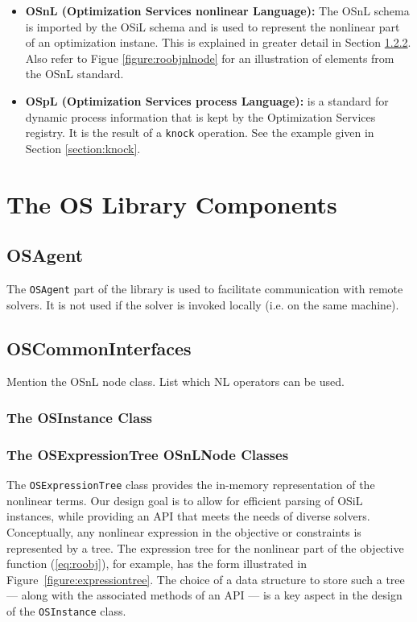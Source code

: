 \documentclass[11pt]{article}
\newcounter{Fig}
\renewcommand{\_}{{\char"5F}}
\renewcommand{\{}{{\char"7B}}
\renewcommand{\}}{{\char"7D}}
\renewcommand{\^}{{\char"0D}}
\renewcommand{\'}{{\char"0D}}
\begin{document}
\begin{itemize}
\item[] {\bf OSnL (Optimization Services nonlinear Language):}  The OSnL schema is imported by the OSiL schema and is used to represent the nonlinear part of an optimization instane. This is explained in greater detail in Section \ref{section:osexpressiontreeclass}. Also refer to Figue \ref{figure:roobjnlnode} for an illustration of elements from the OSnL standard. 



\item[]   {\bf OSpL (Optimization Services process Language):} is a standard for dynamic process information that is kept by the Optimization Services registry. 
It is the result of a {\tt knock} operation. See the example given in Section \ref{section:knock}.

\end{itemize}

\section{The OS Library Components}\label{section:oslibrary}

\subsection{OSAgent}\label{section:osagent}

The {\tt OSAgent}  part of the library is used to facilitate communication with remote solvers. It is not used if the solver is invoked locally (i.e. on the same machine). 

\subsection{OSCommonInterfaces}

Mention the OSnL node class. List which NL operators can be used.

\subsubsection{The OSInstance Class}\label{section:osinstanceclass}

\subsubsection{The OSExpressionTree OSnLNode Classes}\label{section:osexpressiontreeclass}

The {\tt OSExpressionTree} class provides the in-memory representation of the nonlinear terms.  Our design goal is  to allow for efficient parsing of OSiL instances, while providing an API that meets the needs of diverse solvers.  Conceptually, any nonlinear expression in the objective or constraints is represented by a tree.  The expression tree for the nonlinear part of the objective function (\ref{eq:roobj}), for example, has the form illustrated in Figure~\ref{figure:expressiontree}.  The choice of a data structure to store such a tree --- along with the associated methods of an API --- is a key aspect in the design of the {\tt OSInstance} class. 
\end{document}
